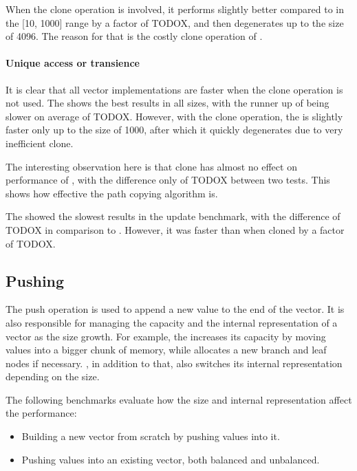 When the clone operation is involved, it performs slightly better compared to \rrbvec{} in the [10, 1000] range by a factor of TODOX, and then degenerates up to the size of 4096. The reason for that is the costly clone operation of \stdvec{}. 

\paragraph*{Unique access or transience}
It is clear that all vector implementations are faster when the clone operation is not used. The \stdvec{} shows the best results in all sizes, with the runner up of \pvec{} being slower on average of TODOX. However, with the clone operation, the \stdvec{} is slightly faster only up to the size of 1000, after which it quickly degenerates due to very inefficient clone. 

The interesting observation here is that clone has almost no effect on performance of \rrbvec{}, with the difference only of TODOX between two tests. This shows how effective the path copying algorithm is. 

The \imrsvec{} showed the slowest results in the update benchmark, with the difference of TODOX in comparison to \rrbvec{}. However, it was faster than \rrbvec{} when cloned by a factor of TODOX. 

\subsection{Pushing}

The push operation is used to append a new value to the end of the vector. It is also responsible for managing the capacity and the internal representation of a vector as the size growth. For example, the \stdvec{} increases its capacity by moving values into a bigger chunk of memory, while \rrbvec{} allocates a new branch and leaf nodes if necessary. \pvec{}, in addition to that, also switches its internal representation depending on the size.

The following benchmarks evaluate how the size and internal representation affect the performance:

\begin{itemize}
    \item Building a new vector from scratch by pushing values into it. 
    \item Pushing values into an existing vector, both balanced and unbalanced. 
\end{itemize}

